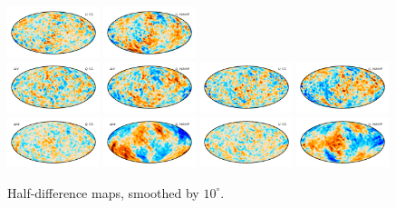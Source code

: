 \documentclass[twocolumn]{../../common/aa}
\begin{document}
\begin{figure}
	\includegraphics[width=0.24\textwidth]{figures/Q_deltaU.pdf}
	\includegraphics[width=0.24\textwidth]{figures/Q_W_deltaU.pdf}\\
	\includegraphics[width=0.24\textwidth]{figures/V_deltaQ.pdf}
	\includegraphics[width=0.24\textwidth]{figures/V_W_deltaQ.pdf}
	\includegraphics[width=0.24\textwidth]{figures/V_deltaU.pdf}
	\includegraphics[width=0.24\textwidth]{figures/V_W_deltaU.pdf}\\
	\includegraphics[width=0.24\textwidth]{figures/W_deltaQ.pdf}
	\includegraphics[width=0.24\textwidth]{figures/W_W_deltaQ.pdf}
	\includegraphics[width=0.24\textwidth]{figures/W_deltaU.pdf}
	\includegraphics[width=0.24\textwidth]{figures/W_W_deltaU.pdf}
	\caption{Half-difference maps, smoothed by $10^\circ$.}
\end{figure}
\end{document}
